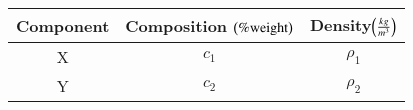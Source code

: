 \begin{tabular}[10pt]{|c|c|c|}
    \hline
    Component & Composition $\left(\% \text{weight}\right)$ & Density$\left(\frac{kg}{m^3}\right)$\\ 
    \hline
    X&$c_1$&$\rho_1$\\
    \hline 
    Y&$c_2$&$\rho_2$\\
    \hline
    \end{tabular}
